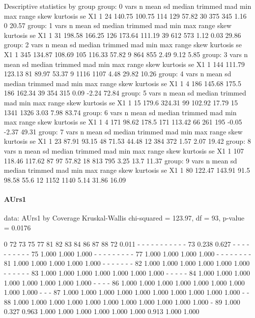 \documentclass[a4paper,headsepline,footsepline,fontsize=11pt,BCOR=12mm,DIV=12]{report}
\begin{document}
 Descriptive statistics by group 
group: 0
   vars  n   mean     sd median trimmed   mad min max range skew kurtosis    se
X1    1 24 140.75 100.75    114     129 57.82  30 375   345 1.16        0 20.57
group: 1
   vars  n   mean     sd median trimmed    mad min max range skew kurtosis    se
X1    1 31 198.58 166.25    126  173.64 111.19  39 612   573 1.12     0.03 29.86
group: 2
   vars   n   mean     sd median trimmed   mad min max range skew kurtosis   se
X1    1 345 134.87 108.69    105  116.33 57.82   9 864   855 2.49     9.12 5.85
group: 3
   vars   n   mean     sd median trimmed   mad min  max range skew kurtosis    se
X1    1 144 111.79 123.13     81   89.97 53.37   9 1116  1107 4.48    29.82 10.26
group: 4
   vars n mean     sd median trimmed    mad min max range skew kurtosis    se
X1    1 4  186 145.68  175.5     186 162.34  39 354   315 0.09    -2.24 72.84
group: 5
   vars  n  mean     sd median trimmed   mad min  max range skew kurtosis    se
X1    1 15 179.6 324.31     99  102.92 17.79  15 1341  1326 3.03     7.98 83.74
group: 6
   vars n mean    sd median trimmed    mad min max range  skew kurtosis    se
X1    1 4  171 98.62  178.5     171 113.42  66 261   195 -0.05    -2.37 49.31
group: 7
   vars  n  mean    sd median trimmed   mad min max range skew kurtosis    se
X1    1 23 87.91 93.15     48   71.53 44.48  12 384   372 1.57     2.07 19.42
group: 8
   vars   n   mean     sd median trimmed   mad min max range skew kurtosis    se
X1    1 107 118.46 117.62     87      97 57.82  18 813   795 3.25     13.7 11.37
group: 9
   vars  n   mean     sd median trimmed  mad min  max range skew kurtosis    se
X1    1 80 122.47 143.91   91.5   98.58 55.6  12 1152  1140 5.14    31.86 16.09

\paragraph{AUrs1}

data:  AUrs1 by Coverage
Kruskal-Wallis chi-squared = 123.97, df = 93, p-value = 0.0176

   0     72    73    75    77    81    82    83    84    86    87    88   
72 0.011 -     -     -     -     -     -     -     -     -     -     -    
73 0.238 0.627 -     -     -     -     -     -     -     -     -     -    
75 1.000 1.000 1.000 -     -     -     -     -     -     -     -     -    
77 1.000 1.000 1.000 1.000 -     -     -     -     -     -     -     -    
81 1.000 1.000 1.000 1.000 1.000 -     -     -     -     -     -     -    
82 1.000 1.000 1.000 1.000 1.000 1.000 -     -     -     -     -     -    
83 1.000 1.000 1.000 1.000 1.000 1.000 1.000 -     -     -     -     -    
84 1.000 1.000 1.000 1.000 1.000 1.000 1.000 1.000 -     -     -     -    
86 1.000 1.000 1.000 1.000 1.000 1.000 1.000 1.000 1.000 -     -     -    
87 1.000 1.000 1.000 1.000 1.000 1.000 1.000 1.000 1.000 1.000 -     -    
88 1.000 1.000 1.000 1.000 1.000 1.000 1.000 1.000 1.000 1.000 1.000 -    
89 1.000 0.327 0.963 1.000 1.000 1.000 1.000 1.000 1.000 0.913 1.000 1.000
\end{document}
